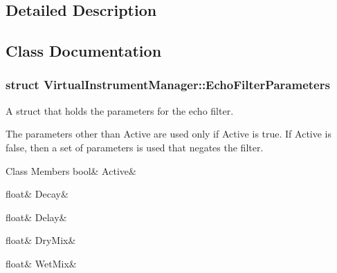 \subsection{Detailed Description}


\subsection{Class Documentation}
\label{struct_virtual_instrument_manager_1_1_echo_filter_parameters}
\subsubsection{struct Virtual\+Instrument\+Manager\+:\+:Echo\+Filter\+Parameters}
A struct that holds the parameters for the echo filter. 

The parameters other than Active are used only if Active is true. If Active is false, then a set of parameters is used that negates the filter. \begin{DoxyFields}{Class Members}
\mbox{\label{group___virtual_instrument_manager_event_types_adbed98a4cc0e2688edabbadfba58a18b}} 
bool&
Active&
\\
\hline

\mbox{\label{group___virtual_instrument_manager_event_types_a7e529eb3e4de120daabef80608dcde27}} 
float&
Decay&
\\
\hline

\mbox{\label{group___virtual_instrument_manager_event_types_a2594ca005d747a272e4aa411bef21f6e}} 
float&
Delay&
\\
\hline

\mbox{\label{group___virtual_instrument_manager_event_types_ab192892df9a03c86b8ce93be434f75be}} 
float&
DryMix&
\\
\hline

\mbox{\label{group___virtual_instrument_manager_event_types_a654d4a14431e8c8758f3f58a97d1e61f}} 
float&
WetMix&
\\
\hline

\end{DoxyFields}
\label{struct_virtual_instrument_manager_1_1_reverb_filter_parameters}
